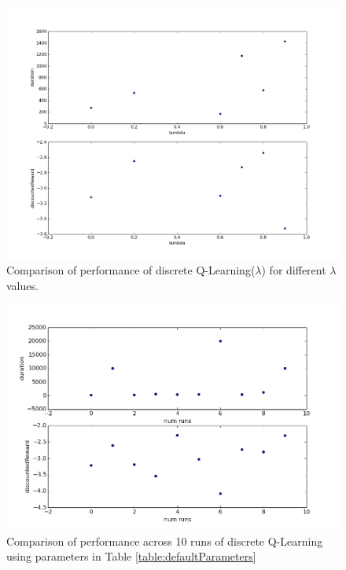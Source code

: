 \documentclass{article}
\begin{document}
\begin{figure}
\centering
\includegraphics[scale=0.5]{figures/discreteQLearningLamComparison.png}
\caption{$\lambda = 0.7$}
\caption{Comparison of performance of discrete Q-Learning($\lambda$) for different $\lambda$ values.}
\label{figures/discreteQLearningLamComparison.png}
\end{figure}



\begin{figure}
\centering
\includegraphics[scale=0.5]{figures/qlearningMultiple.png}
\caption{Comparison of performance across 10 runs of discrete Q-Learning using parameters in Table \ref{table:defaultParameters}}
\label{figures/qlearningMultiple.png}
\end{figure}
\end{document}
